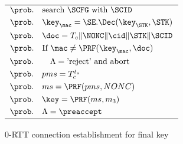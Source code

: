 \begin{figure*}[htb]
\begin{center}
{\begin{minipage}[t]{0.39\textwidth}
\begin{tabular}[c]{l}
 $\prob.\quad \text{search $\SCFG$ with $\SCID$}$ \\
 $\prob.\quad \key_{\mac} = \SE.\Dec(\key_{\STK}, \STK) $\\
 $\prob.\quad \doc = T_c \| \NONC \| \cid \| \STK \| \SCID$ \\
 $\prob.\quad \text{If }\mac \neq \PRF(\key_{\mac}, \doc)$ \\
 $\prob.\quad \quad \Lambda = \text{'reject' and abort}$ \\
 $\prob.\quad pms = T_c^{t_s}$ \\
 $\prob.\quad ms = \PRF(pms, NONC)$ \\
 $\prob.\quad \key = \PRF(ms, m_3)$ \\
 $\prob.\quad \Lambda = \preaccept$ \\
\end{tabular}
\end{minipage}%
} \vspace{10pt}

0-RTT connection establishment for final key
\vspace{10pt}\\


\end{center}
\end{figure*}
